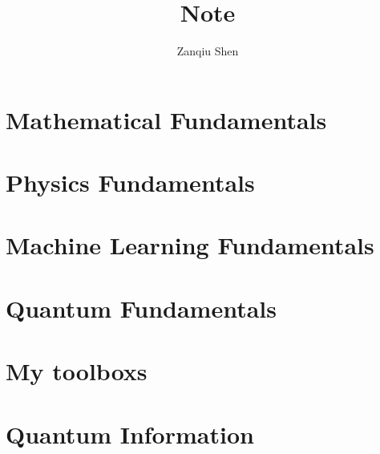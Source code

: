 \documentclass[a4paper,11pt,openany]{book}
\numberwithin{equation}{section}
\begin{document}
\title{\textbf{Note}}
\author{Zanqiu Shen}
\maketitle
%
\tableofcontents

\setcounter{chapter}{0}
\part{Mathematical Fundamentals}





\part{Physics Fundamentals}


\part{Machine Learning Fundamentals}


\part{Quantum Fundamentals}






\part{My toolboxs}



\part{Quantum Information}




\newpage
{}%


\end{document}
